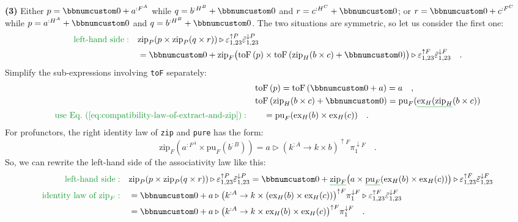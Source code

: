 \textbf{(3)} Either $p=\bbnum 0+a^{:F^{A}}$ while $q=b^{:H^{B}}+\bbnum 0$
and $r=c^{:H^{C}}+\bbnum 0$; or $r=\bbnum 0+c^{:F^{C}}$ while $p=a^{:H^{A}}+\bbnum 0$
and $q=b^{:H^{B}}+\bbnum 0$. The two situations are symmetric, so
let us consider the first one:
\begin{align*}
{\color{greenunder}\text{left-hand side}:}\quad & \text{zip}_{P}(p\times\text{zip}_{P}(q\times r))\triangleright\varepsilon_{1,23}^{\uparrow P}\tilde{\varepsilon}_{1,23}^{\downarrow P}\\
 & =\bbnum 0+\text{zip}_{F}\big(\text{toF}\,(p)\times\text{toF}\,(\text{zip}_{H}(b\times c)+\bbnum 0)\big)\triangleright\varepsilon_{1,23}^{\uparrow F}\tilde{\varepsilon}_{1,23}^{\downarrow F}\quad.
\end{align*}
Simplify the sub-expressions involving \lstinline!toF! separately:
\begin{align*}
 & \text{toF}\,(p)=\text{toF}\,(\bbnum 0+a)=a\quad,\\
 & \text{toF}\,(\text{zip}_{H}(b\times c)+\bbnum 0)=\text{pu}_{F}(\gunderline{\text{ex}_{H}(\text{zip}_{H}}(b\times c))\\
{\color{greenunder}\text{use Eq.~(\ref{eq:compatibility-law-of-extract-and-zip})}:}\quad & \quad=\text{pu}_{F}(\text{ex}_{H}(b)\times\text{ex}_{H}(c))\quad.
\end{align*}
For profunctors, the right identity law of \lstinline!zip! and \lstinline!pure!
has the form:
\[
\text{zip}_{F}(a^{:F^{A}}\times\text{pu}_{F}(b^{:B}))=a\triangleright(k^{:A}\rightarrow k\times b)^{\uparrow F}\pi_{1}^{\downarrow F}\quad.
\]
So, we can rewrite the left-hand side of the associativity law like
this:
\begin{align*}
{\color{greenunder}\text{left-hand side}:}\quad & \text{zip}_{P}(p\times\text{zip}_{P}(q\times r))\triangleright\varepsilon_{1,23}^{\uparrow P}\tilde{\varepsilon}_{1,23}^{\downarrow P}=\bbnum 0+\gunderline{\text{zip}_{F}}\big(a\times\gunderline{\text{pu}_{F}}(\text{ex}_{H}(b)\times\text{ex}_{H}(c))\big)\triangleright\varepsilon_{1,23}^{\uparrow F}\tilde{\varepsilon}_{1,23}^{\downarrow F}\\
{\color{greenunder}\text{identity law of }\text{zip}_{F}:}\quad & =\bbnum 0+a\triangleright\big(k^{:A}\rightarrow k\times(\text{ex}_{H}(b)\times\text{ex}_{H}(c))\big)^{\uparrow F}\pi_{1}^{\downarrow F}\triangleright\varepsilon_{1,23}^{\uparrow F}\tilde{\varepsilon}_{1,23}^{\downarrow F}\\
 & =\bbnum 0+a\triangleright\big(k^{:A}\rightarrow k\times\text{ex}_{H}(b)\times\text{ex}_{H}(c)\big)^{\uparrow F}\pi_{1}^{\downarrow F}\quad.
\end{align*}
